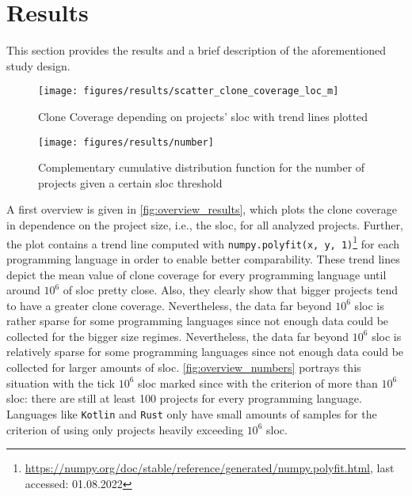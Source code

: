 
\section{Results}
\label{sec:results}

This section provides the results and a brief description of the aforementioned study design.

\begin{figure}[tbh!]
	\centering
	\texttt{[image: figures/results/scatter\_clone\_coverage\_loc\_m]}
	\caption{Clone Coverage depending on projects' \ac{sloc} with trend lines plotted}
	\label{fig:overview_results}
\end{figure}

\begin{figure}[tbh!]
	\centering
	\texttt{[image: figures/results/number]}
	\caption{Complementary cumulative distribution function for the number of projects given a certain \ac{sloc} threshold}
	\label{fig:overview_numbers}
\end{figure}

A first overview is given in \autoref{fig:overview_results}, which plots the clone coverage in dependence on the project size, i.e., the \acl{sloc}, for all analyzed projects. Further, the plot contains a trend line computed with \texttt{numpy.polyfit(x, y, 1)}\footnote{\url{https://numpy.org/doc/stable/reference/generated/numpy.polyfit.html}, last accessed: 01.08.2022} for each programming language in order to enable better comparability. These trend lines depict the mean value of clone coverage for every programming language until around $10^6$ of \ac{sloc} pretty close. Also, they clearly show that bigger projects tend to have a greater clone coverage.
Nevertheless, the data far beyond $10^6$ \acl{sloc} is rather sparse for some programming languages since not enough data could be collected for the bigger size regimes.
Nevertheless, the data far beyond $10^6$ \acl{sloc} is relatively sparse for some programming languages since not enough data could be collected for larger amounts of \ac{sloc}.
\autoref{fig:overview_numbers} portrays this situation with the tick $10^6$ \ac{sloc} marked since with the criterion of more than $10^6$ \ac{sloc}: there are still at least 100 projects for every programming language. 
Languages like \texttt{Kotlin} and \texttt{Rust} only have small amounts of samples for the criterion of using only projects heavily exceeding $10^6$ \ac{sloc}.

